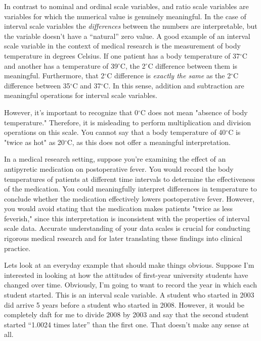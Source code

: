 In contrast to nominal and ordinal scale variables,  and ratio scale variables are variables for which the numerical value is genuinely meaningful. In the case of interval scale variables the {\it differences} between the numbers are interpretable, but the variable doesn't have a ``natural'' zero value. A good example of an interval scale variable in the context of medical research is the measurement of body temperature in degrees Celsius. If one patient has a body temperature of 37$^\circ$C and another has a temperature of 39$^\circ$C, the 2$^\circ$C difference between them is meaningful. Furthermore, that 2$^\circ$C difference is \textit{exactly the same} as the 2$^\circ$C difference between 35$^\circ$C and 37$^\circ$C. In this sense, addition and subtraction are meaningful operations for interval scale variables.  

However, it's important to recognize that 0$^\circ$C does not mean "absence of body temperature." Therefore, it is misleading to perform multiplication and division operations on this scale. You cannot say that a body temperature of 40$^\circ$C is "twice as hot" as 20$^\circ$C, as this does not offer a meaningful interpretation.

In a medical research setting, suppose you're examining the effect of an antipyretic medication on postoperative fever. You would record the body temperatures of patients at different time intervals to determine the effectiveness of the medication. You could meaningfully interpret differences in temperature to conclude whether the medication effectively lowers postoperative fever. However, you would avoid stating that the medication makes patients "twice as less feverish," since this interpretation is inconsistent with the properties of interval scale data. Accurate understanding of your data scales is crucial for conducting rigorous medical research and for later translating these findings into clinical practice.

Lets look at an everyday example that should make things obvious. Suppose I'm interested in looking at how the attitudes of first-year university students have changed over time. Obviously, I'm going to want to record the year in which each student started. This is an interval scale variable. A student who started in 2003 did arrive 5 years before a student who started in 2008. However, it would be completely daft for me to divide 2008 by 2003 and say that the second student started ``1.0024 times later'' than the first one. That doesn't make any sense at all.

